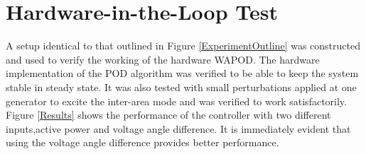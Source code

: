 \documentclass[conference]{IEEEtran}
\begin{document}
\section{Hardware-in-the-Loop Test} \label{HILtest}
A setup identical to that outlined in Figure \ref{ExperimentOutline} was constructed and used to verify the working of the hardware WAPOD. %
The hardware implementation of the POD algorithm was verified to be able to keep the system stable in steady state. It was also tested with small perturbations applied at one generator to excite the inter-area mode and was verified to work satisfactorily. Figure \ref{Results} shows the performance of the controller with two different inputs,active power and voltage angle difference. It is immediately evident that using the voltage angle difference provides better performance. %

\end{document}

